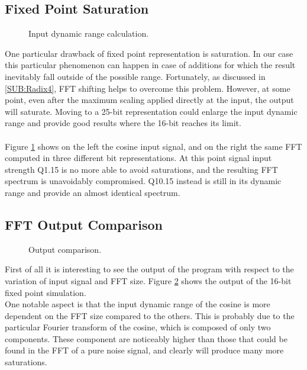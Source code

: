 \documentclass[a4paper]{article}
\begin{document}
\subsection{Fixed Point Saturation}
\begin{figure}
	\centering
	\resizebox{1.0\textwidth}{!}{}
	\caption{Input dynamic range calculation.}
	\label{Fig:COSINE}
\end{figure}
One particular drawback of fixed point representation is saturation. In our case this particular phenomenon can happen in case of additions for which the result inevitably fall outside of the possible range. Fortunately, as discussed in \ref{SUB:Radix4}, FFT shifting helps to overcome this problem.
However, at some point, even after the maximum scaling applied directly at the input, the output will saturate. Moving to a 25-bit representation could enlarge the input dynamic range and provide good results where the 16-bit reaches its limit.\\\\
Figure \ref{Fig:COSINE} shows on the left the cosine input signal, and on the right the same FFT computed in three different bit representations. At this point signal input strength Q1.15 is no more able to avoid saturations, and the resulting FFT spectrum is unavoidably compromised. Q10.15 instead is still in its dynamic range and provide an almost identical spectrum.
\subsection{FFT Output Comparison}
\begin{figure}
	\centering
	\resizebox{1.0\textwidth}{!}{}

	\caption{Output comparison.}
	\label{Fig:COMP}
\end{figure}
First of all it is interesting to see the output of the program with respect to the variation of input signal and FFT size. Figure \ref{Fig:COMP} shows the output of the 16-bit fixed point simulation.\\
One notable aspect is that the input dynamic range of the cosine is more dependent on the FFT size compared to the others. This is probably due to the particular Fourier transform of the cosine, which is composed of only two components. These component are noticeably higher than those that could be found in the FFT of a pure noise signal, and clearly will produce many more saturations.
\end{document}
